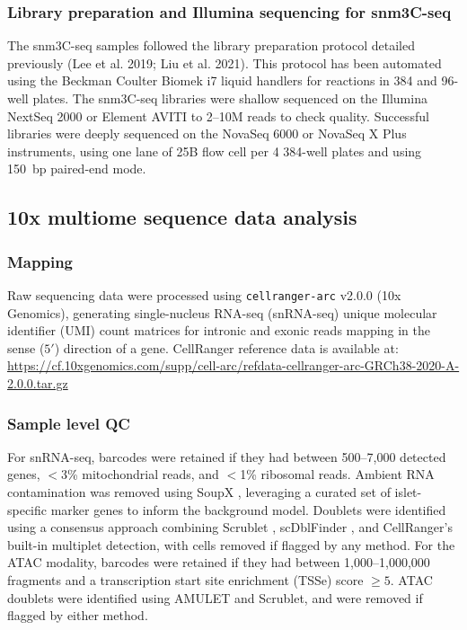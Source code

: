 \subsubsection{Library preparation and Illumina sequencing for snm3C-seq}

The snm3C-seq samples followed the library preparation protocol detailed previously (Lee et al. 2019; Liu et al. 2021). This protocol has been automated using the Beckman Coulter Biomek i7 liquid handlers for reactions in 384 and 96-well plates. The snm3C-seq libraries were shallow sequenced on the Illumina NextSeq 2000 or Element AVITI to 2--10M reads to check quality. Successful libraries were deeply sequenced on the NovaSeq 6000 or NovaSeq X Plus instruments, using one lane of 25B flow cell per 4 384-well plates and using 150~bp paired-end mode.

\subsection*{10x multiome sequence data analysis}

\subsubsection{Mapping}
Raw sequencing data were processed using \texttt{cellranger-arc} v2.0.0 (10x Genomics), generating single-nucleus RNA-seq (snRNA-seq) unique molecular identifier (UMI) count matrices for intronic and exonic reads mapping in the sense ($5'$) direction of a gene. CellRanger reference data is available at: \url{https://cf.10xgenomics.com/supp/cell-arc/refdata-cellranger-arc-GRCh38-2020-A-2.0.0.tar.gz}

\subsubsection{Sample level QC}
For snRNA-seq, barcodes were retained if they had between 500--7{,}000 detected genes, $<$3\% mitochondrial reads, and $<$1\% ribosomal reads. Ambient RNA contamination was removed using SoupX \cite{Young2020-qv}, leveraging a curated set of islet-specific marker genes to inform the background model. Doublets were identified using a consensus approach combining Scrublet \cite{Wolock2019-hq}, scDblFinder \cite{Germain2021-uf}, and CellRanger's built-in multiplet detection, with cells removed if flagged by any method. For the ATAC modality, barcodes were retained if they had between 1{,}000--1{,}000{,}000 fragments and a transcription start site enrichment (TSSe) score $\geq 5$. ATAC doublets were identified using AMULET \cite{Thibodeau2021-gy} and Scrublet, and were removed if flagged by either method.

